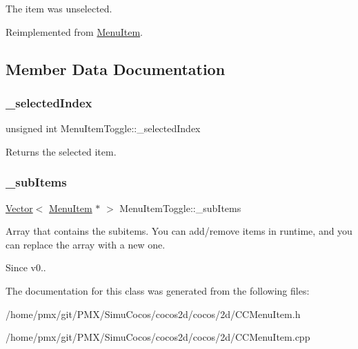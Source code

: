 The item was unselected. 

Reimplemented from \hyperlink{classMenuItem_a3abeecc6d59ada50f4123e3e36ae4892}{Menu\+Item}.



\subsection{Member Data Documentation}
\mbox{\label{classMenuItemToggle_a28bf660bc45cb46f525741d7288bbba1}} 
\subsubsection{\texorpdfstring{\+\_\+selected\+Index}{\_selectedIndex}}
{\footnotesize\ttfamily unsigned int Menu\+Item\+Toggle\+::\+\_\+selected\+Index\hspace{0.3cm}{\ttfamily [protected]}}

Returns the selected item. \mbox{\label{classMenuItemToggle_ae4aca3a1128d6c460179c1a53054d51f}} 
\subsubsection{\texorpdfstring{\+\_\+sub\+Items}{\_subItems}}
{\footnotesize\ttfamily \hyperlink{classVector}{Vector}$<$ \hyperlink{classMenuItem}{Menu\+Item} $\ast$ $>$ Menu\+Item\+Toggle\+::\+\_\+sub\+Items\hspace{0.3cm}{\ttfamily [protected]}}

Array that contains the subitems. You can add/remove items in runtime, and you can replace the array with a new one. \begin{DoxySince}{Since}
v0.. 
\end{DoxySince}


The documentation for this class was generated from the following files\+:\begin{DoxyCompactItemize}
\item 
/home/pmx/git/\+P\+M\+X/\+Simu\+Cocos/cocos2d/cocos/2d/C\+C\+Menu\+Item.\+h\item 
/home/pmx/git/\+P\+M\+X/\+Simu\+Cocos/cocos2d/cocos/2d/C\+C\+Menu\+Item.\+cpp\end{DoxyCompactItemize}
